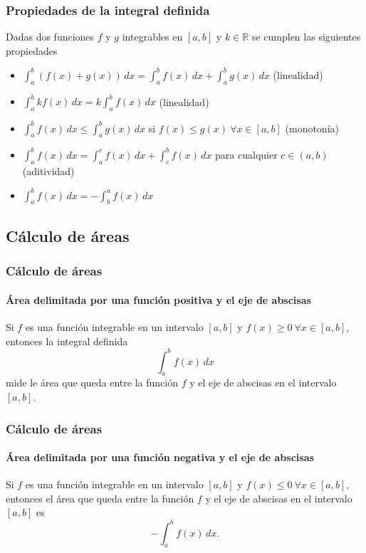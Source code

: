 \begin{frame}
	\frametitle{Propiedades de la integral definida}
	Dadas dos funciones $f$ y $g$ integrables en $[a,b]$ y $k \in \mathbb{R}$ se cumplen las siguientes propiedades
	\begin{itemize}
		\item $\int_{a}^{b}(f(x)+g(x))\,dx=\int_{a}^{b}f(x)\,dx+\int_{a}^{b}g(x)\,dx$ (linealidad)
		\item $\int_{a}^{b}{kf(x)}\,dx=k\int_{a}^{b}{f(x)}\,dx$ (linealidad)
		\item $\int_{a}^{b}{f(x)\,dx} \leq \int_{a}^{b}{g(x)\,dx}$ si $f(x)\leq g(x)\ \forall x \in [a,b]$ (monotonía)
		\item $\int_{a}^{b}{f(x)\,dx} = \int_{a}^{c}{f(x)\,dx}+\int_{c}^{b}{f(x)\,dx}$ para cualquier $c\in(a,b)$ (aditividad)
		\item $\int_a^b f(x)\,dx = -\int_b^a f(x)\,dx$
	\end{itemize}
\end{frame}



\subsection{Cálculo de áreas}
\begin{frame}
	\frametitle{Cálculo de áreas}
	\framesubtitle{Área delimitada por una función positiva y el eje de abscisas}
	Si $f$ es una función integrable en un intervalo $[a,b]$ y $f(x)\geq 0\ \forall x\in[a,b]$, entonces la integral definida
	\[\int_a^b f(x)\,dx\]
	mide le área que queda entre la función $f$ y el eje de abscisas en el intervalo $[a,b]$.
	\begin{center}
		\scalebox{1}{}
	\end{center}
\end{frame}


\begin{frame}
	\frametitle{Cálculo de áreas}
	\framesubtitle{Área delimitada por una función negativa y el eje de abscisas}
	Si $f$ es una función integrable en un intervalo $[a,b]$ y $f(x)\leq 0\ \forall x\in[a,b]$, entonces el área que queda entre la función $f$ y el eje de abscisas en el intervalo $[a,b]$ es
	\[
		-\int_a^b f(x)\,dx.
	\]
	\begin{center}
		\scalebox{1}{}
	\end{center}
\end{frame}


